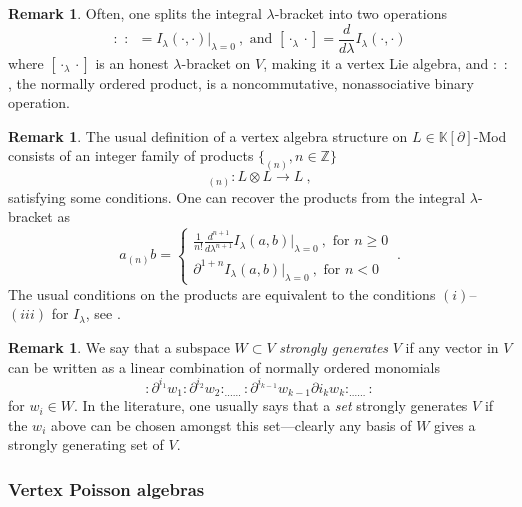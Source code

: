 \documentclass[11pt]{amsart}
\numberwithin{equation}{section}
\theoremstyle{definition}
\newtheorem{rmk}[theo]{Remark}
\newcommand{\bb}{\mathbb}
\newcommand{\mc}{\mathcal}
\newcommand{\ik}{{\bb K}}
\newcommand{\0}{{\textbf{0}}}
\newcommand{\DD}{{D}}
\def\IZ{\mathbb{Z}}
\begin{document}
\begin{rmk}
Often, one splits the integral $\lambda$-bracket into two operations
\[
:\,\,: \,\,\, = I_\lambda(\cdot,\cdot)|_{\lambda=0} ~, \text{ and } [\cdot_\lambda \cdot] = \frac{d}{d\lambda}I_\lambda(\cdot,\cdot)
\]
where $[\cdot_\lambda\cdot]$ is an honest $\lambda$-bracket on $V$, making it a vertex Lie algebra, and $:\,\,:$, the normally ordered product, is a noncommutative, nonassociative binary operation.
	
\end{rmk}

\begin{rmk}
	The usual definition of a vertex algebra structure on $L\in\ik[\partial]$-Mod consists of an integer family of products $\{_{(n)},n\in\IZ\}$
	\[
	_{(n)} : L\otimes L \rightarrow L ~,
	\]
	satisfying some conditions. One can recover the products from the integral $\lambda$-bracket as 
	\[
	{a}_{(n)} b = 
	\begin{cases}
	\tfrac{1}{n!}\tfrac{d^{n+1}}{d\lambda^{n+1}} I_\lambda(a,b)|_{\lambda=0}~, \text{ for }n\ge0\\
	\partial^{1+n} I_\lambda(a,b)|_{\lambda=0} ~, \text{ for } n <0
	\end{cases} 
	~.
	\]
	The usual conditions on the products are equivalent to the conditions $(i)$--$(iii)$ for $I_\lambda$, see \cite{KacDeSole06}.
\end{rmk}

\begin{rmk}
We say that a subspace $W\subset V$ \emph{strongly generates} $V$ if any vector in $V$ can be written as a linear combination of normally ordered monomials
\[
:\partial^{i_1}w_1 : \partial^{i_2}w_2:_{\dots\dots}:\partial^{i_{k-1}}w_{k-1}\partial{i_k} w_k:_{\dots\dots} :
\]
for $w_i\in W$. In the literature, one usually says that a \emph{set} strongly generates $V$ if the $w_i$ above can be chosen amongst this set---clearly any basis of $W$ gives a strongly generating set of $V$.
\end{rmk}








\subsubsection{Vertex Poisson algebras}
\end{document}
